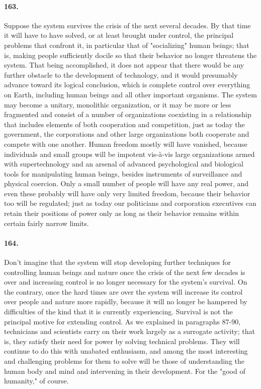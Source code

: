\documentclass[12pt]{book}
\begin{document}
\paragraph{163.} Suppose the system survives the crisis of the next several decades.  By that time it will have to have solved, or at least brought under control, the principal problems that confront it, in particular that of "socializing" human beings; that is, making people sufficiently docile so that their behavior no longer threatens the system. That being accomplished, it does not appear that there would be any further obstacle to the development of technology, and it would presumably advance toward its logical conclusion, which is complete control over everything on Earth, including human beings and all other important organisms. The system may become a unitary, monolithic organization, or it may be more or less fragmented and consist of a number of organizations coexisting in a relationship that includes elements of both cooperation and competition, just as today the government, the corporations and other large organizations both cooperate and compete with one another. Human freedom mostly will have vanished, because individuals and small groups will be impotent vis-à-vis large organizations armed with supertechnology and an arsenal of advanced psychological and biological tools for manipulating human beings, besides instruments of surveillance and physical coercion. Only a small number of people will have any real power, and even these probably will have only very limited freedom, because their behavior too will be regulated; just as today our politicians and corporation executives can retain their positions of power only as long as their behavior remains within certain fairly narrow limits.


\paragraph{164.} Don't imagine that the system will stop developing further techniques for controlling human beings and nature once the crisis of the next few decades is over and increasing control is no longer necessary for the system's survival. On the contrary, once the hard times are over the system will increase its control over people and nature more rapidly, because it will no longer be hampered by difficulties of the kind that it is currently experiencing. Survival is not the principal motive for extending control. As we explained in paragraphs 87-90, technicians and scientists carry on their work largely as a surrogate activity; that is, they satisfy their need for power by solving technical problems. They will continue to do this with unabated enthusiasm, and among the most interesting and challenging problems for them to solve will be those of understanding the human body and mind and intervening in their development. For the "good of humanity," of course.
\end{document}
